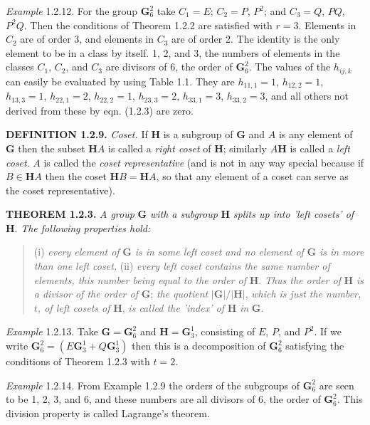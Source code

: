 \documentclass[11pt,a4paper,twoside,openright]{book}
\begin{document}
\textit{Example} 1.2.12. For the group $\mathbf{G}_6^2$ take $C_{1} = E$; $C_{2} = P$, $P^{2}$; and $C_{3} = Q$, $PQ$, $P^{2}Q$. Then the conditions of Theorem 1.2.2 are satisfied with $r = 3$. Elements in $C_{2}$ are of order 3, and elements in $C_{3}$ are of order 2. The identity is the only element to be in a class by itself. 1, 2, and 3, the numbers of elements in the classes $C_{1}$, $C_{2}$, and $C_{3}$ are divisors of 6, the order of $\mathbf{G}_6^2$. The values of the $h_{ij,k}$ can easily be evaluated by using Table 1.1. They are $h_{11,1} = 1$, $h_{12,2} = 1$, $h_{13,3} = 1$, $h_{22,1} = 2$, $h_{22,2} = 1$, $h_{23,3} = 2$, $h_{33,1} = 3$, $h_{33,2} = 3$, and all others not derived from these by eqn. (1.2.3) are zero.

\textbf{DEFINITION 1.2.9.} \textit{Coset.} If $\mathbf{H}$ is a subgroup of $\mathbf{G}$ and $A$ is any element of $\mathbf{G}$ then the subset $\mathbf{H}A$ is called a \textit{right coset} of $\mathbf{H}$; similarly $A\mathbf{H}$ is called a \textit{left coset}. $A$ is called the \textit{coset representative} (and is not in any way special because if $B \in \mathbf{H}A$ then the coset $\mathbf{H}B = \mathbf{H}A$, so that any element of a coset can serve as the coset representative).

\textbf{THEOREM 1.2.3.} \textit{A group} $\mathbf{G}$ \textit{with a subgroup} $\mathbf{H}$ \textit{splits up into 'left cosets' of} $\mathbf{H}$. \textit{The following properties hold:}

\begin{quote}(i) \textit{every element of} $\mathbf{G}$ \textit{is in some left coset and no element of} $\mathbf{G}$ \textit{is in more than one left coset,} (ii) \textit{every left coset contains the same number of elements, this number being equal to the order of} $\mathbf{H}$. \textit{Thus the order of} $\mathbf{H}$ \textit{is a divisor of the order of} $\mathbf{G}$; \textit{the quotient} $|\mathbf{G}|/|\mathbf{H}|$, \textit{which is just the number, $t$, of left cosets of} $\mathbf{H}$, \textit{is called the 'index' of} $\mathbf{H}$ \textit{in} $\mathbf{G}$.\end{quote}

\textit{Example} 1.2.13. Take $\mathbf{G} = \mathbf{G}_6^2$ and $\mathbf{H} = \mathbf{G}_3^1$, consisting of $E$, $P$, and $P^{2}$. If we write $\mathbf{G}_6^2 = (E\mathbf{G}_3^1 + Q\mathbf{G}_3^1)$ then this is a decomposition of $\mathbf{G}_6^2$ satisfying the conditions of Theorem 1.2.3 with $t = 2$.

\textit{Example} 1.2.14. From Example 1.2.9 the orders of the subgroups of $\mathbf{G}_6^2$ are seen to be 1, 2, 3, and 6, and these numbers are all divisors of 6, the order of $\mathbf{G}_6^2$. This division property is called Lagrange's theorem.
\end{document}
